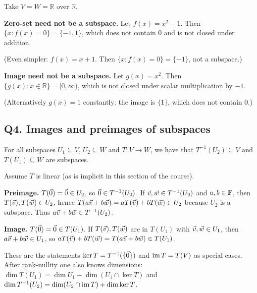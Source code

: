 \begin{coursebox}
Take $V=W=\mathbb{R}$ over $\mathbb{R}$.

\textbf{Zero-set need not be a subspace.}
Let $f(x)=x^2-1$. Then $\{x:f(x)=0\}=\{-1,1\}$, which does not contain $0$ and
is not closed under addition.

(Even simpler: $f(x)=x+1$. Then $\{x:f(x)=0\}=\{-1\}$, not a subspace.)

\textbf{Image need not be a subspace.}
Let $g(x)=x^2$. Then $\{g(x):x\in\mathbb{R}\}=[0,\infty)$, which is not closed
under scalar multiplication by $-1$.

(Alternatively $g(x)=1$ constantly: the image is $\{1\}$, which does not contain
$0$.)
\end{coursebox}

\subsection{Q4. Images and preimages of subspaces}

\begin{promptbox}
For all subspaces $U_1\subseteq V$, $U_2\subseteq W$ and $T:V\to W$, we have that
$T^{-1}(U_2)\subseteq V$ and $T(U_1)\subseteq W$ are subspaces.
\end{promptbox}

\begin{coursebox}
Assume $T$ is linear (as is implicit in this section of the course).

\textbf{Preimage.}
$T(\vec{0})=\vec{0}\in U_2$, so $\vec{0}\in T^{-1}(U_2)$. If $\vec{v},\vec{w}\in T^{-1}(U_2)$
and $a,b\in\mathbb{F}$, then $T(\vec{v}),T(\vec{w})\in U_2$, hence
$T(a\vec{v}+b\vec{w})=aT(\vec{v})+bT(\vec{w})\in U_2$ because $U_2$ is a subspace. Thus
$a\vec{v}+b\vec{w}\in T^{-1}(U_2)$.

\textbf{Image.}
$T(\vec{0})=\vec{0}\in T(U_1)$. If $T(\vec{v}),T(\vec{w})$ are in $T(U_1)$ with
$\vec{v},\vec{w}\in U_1$, then $a\vec{v}+b\vec{w}\in U_1$, so
$aT(\vec{v})+bT(\vec{w})=T(a\vec{v}+b\vec{w})\in T(U_1)$.
\end{coursebox}

\begin{laterbox}
These are the statements $\ker T=T^{-1}(\{\vec{0}\})$ and $\operatorname{im} T=T(V)$ as special
cases. After rank-nullity one also knows dimensions:
$\dim T(U_1)=\dim U_1-\dim(U_1\cap\ker T)$ and
$\dim T^{-1}(U_2)=\dim(U_2\cap\operatorname{im} T)+\dim\ker T$.
\end{laterbox}
